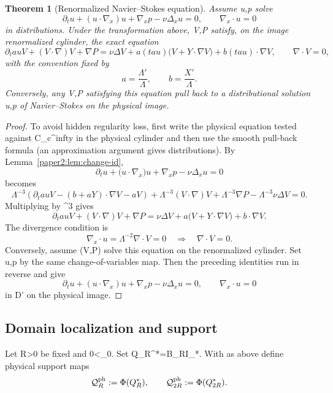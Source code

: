 \documentclass[11pt]{amsart}
\def\({}%
\def\){}%
\def\tau{tau}%
\def\infty{infty}%
\theoremstyle{plain}
\newtheorem{theorem}{Theorem}[section]
\theoremstyle{definition}
\theoremstyle{remark}
\newcommand{\nn}{\nabla}
\begin{document}
\begin{theorem}[Renormalized Navier--Stokes equation]\label{paper2:thm:ren-NS}
Assume \(u,p\) solve
\[
\partial_t u+(u\cdot\nn_x)u+\nn_x p-\nu\Delta_xu=0,\qquad \nn_x\cdot u=0
\]
in distributions. Under the transformation above, \(V,P\) satisfy, on the image
renormalized cylinder, the exact equation
\[
\partial_\tau V+(V\cdot\nn)V+\nn P
=\nu\Delta V
+a(\tau)\bigl(V+Y\cdot\nn V\bigr)+b(\tau)\cdot\nn V,\qquad \nn\cdot V=0,
\]
with the convention fixed by
\[
a=\frac{\Lambda'}{\Lambda},\qquad b=\frac{X'}{\Lambda}.
\]
Conversely, any \(V,P\) satisfying this equation pull back to a distributional
solution \(u,p\) of Navier--Stokes on the physical image.
\end{theorem}
\begin{proof}
To avoid hidden regularity loss, first write the physical equation tested against
\(\Phi\in C_c^\infty\) in the physical cylinder and then use the smooth pull-back formula
(an approximation argument gives distributions). By Lemma~\ref{paper2:lem:change-id},
\[
\partial_tu+\bigl(u\cdot\nabla_x\bigr)u+\nabla_xp-\nu\Delta_xu=0
\]
becomes
\[
\Lambda^{-3}\!\left(\partial_\tau V-(b+aY)\cdot\nabla V-aV\right)
+\Lambda^{-3}(V\cdot\nabla)V
+\Lambda^{-3}\nabla P
-\Lambda^{-3}\nu\Delta V=0.
\]
Multiplying by \(\Lambda^3\) gives
\[
\partial_\tau V+(V\cdot\nabla)V+\nabla P
=
\nu\Delta V
+a\bigl(V+Y\cdot\nabla V\bigr)+b\cdot\nabla V.
\]
The divergence condition is
\[
\nabla_x\cdot u=\Lambda^{-2}\nabla\cdot V=0
\quad\Longrightarrow\quad
\nabla\cdot V=0.
\]
Conversely, assume \((V,P)\) solve this equation on the renormalized cylinder.
Set \(u,p\) by the same change-of-variables map.
Then the preceding identities run in reverse and give
 \[
\partial_t u+(u\cdot\nabla_x)u+\nabla_xp-\nu\Delta_xu=0,\qquad
\nabla_x\cdot u=0
\]
in \(\mathcal D'\) on the physical image.
\end{proof}

\subsection{Domain localization and support}\label{paper2:sec:domains}

Let \(R>0\) be fixed and \(0<\ell\le \ell_0\). Set \(Q_R^*=B_R\times I_*\).
With \(\Phi\) as above define physical support maps
\[
\mathcal Q^{\rm ph}_{R}:=\Phi(Q_R^*),\qquad
\mathcal Q^{\rm ph}_{2R}:=\Phi(Q_{2R}^*).
\]
\end{document}
